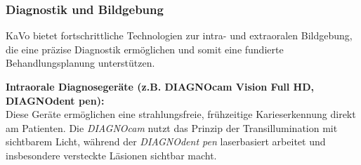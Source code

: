 \subsubsection{Diagnostik und Bildgebung}

KaVo bietet fortschrittliche Technologien zur intra- und extraoralen Bildgebung, die eine präzise Diagnostik ermöglichen und somit eine fundierte Behandlungsplanung unterstützen.

\textbf{Intraorale Diagnosegeräte (z.B. DIAGNOcam Vision Full HD, DIAGNOdent pen):} \\
Diese Geräte ermöglichen eine strahlungsfreie, frühzeitige Karieserkennung direkt am Patienten. Die \textit{DIAGNOcam} nutzt das Prinzip der Transillumination mit sichtbarem Licht, während der \textit{DIAGNOdent pen} laserbasiert arbeitet und insbesondere versteckte Läsionen sichtbar macht.

